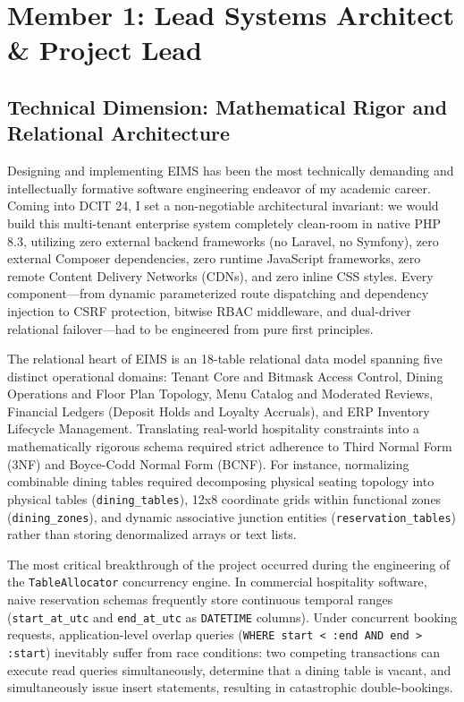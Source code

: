 \section{Member 1: Lead Systems Architect \& Project Lead}
\label{sec:reflection_member_1}

\subsection{Technical Dimension: Mathematical Rigor and Relational Architecture}
Designing and implementing EIMS has been the most technically demanding and intellectually formative software engineering endeavor of my academic career. Coming into DCIT 24, I set a non-negotiable architectural invariant: we would build this multi-tenant enterprise system completely clean-room in native PHP 8.3, utilizing zero external backend frameworks (no Laravel, no Symfony), zero external Composer dependencies, zero runtime JavaScript frameworks, zero remote Content Delivery Networks (CDNs), and zero inline CSS styles. Every component---from dynamic parameterized route dispatching and dependency injection to CSRF protection, bitwise RBAC middleware, and dual-driver relational failover---had to be engineered from pure first principles.

The relational heart of EIMS is an 18-table relational data model spanning five distinct operational domains: Tenant Core and Bitmask Access Control, Dining Operations and Floor Plan Topology, Menu Catalog and Moderated Reviews, Financial Ledgers (Deposit Holds and Loyalty Accruals), and ERP Inventory Lifecycle Management. Translating real-world hospitality constraints into a mathematically rigorous schema required strict adherence to Third Normal Form (3NF) and Boyce-Codd Normal Form (BCNF). For instance, normalizing combinable dining tables required decomposing physical seating topology into physical tables (\texttt{dining\_tables}), 12x8 coordinate grids within functional zones (\texttt{dining\_zones}), and dynamic associative junction entities (\texttt{reservation\_tables}) rather than storing denormalized arrays or text lists.

The most critical breakthrough of the project occurred during the engineering of the \texttt{TableAllocator} concurrency engine. In commercial hospitality software, naive reservation schemas frequently store continuous temporal ranges (\texttt{start\_at\_utc} and \texttt{end\_at\_utc} as \texttt{DATETIME} columns). Under concurrent booking requests, application-level overlap queries (\texttt{WHERE start < :end AND end > :start}) inevitably suffer from race conditions: two competing transactions can execute read queries simultaneously, determine that a dining table is vacant, and simultaneously issue insert statements, resulting in catastrophic double-bookings.

